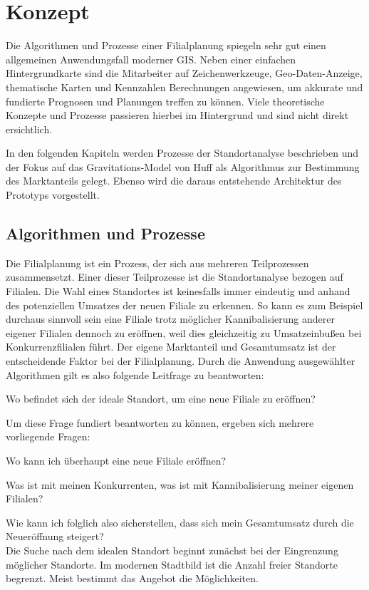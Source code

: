 \chapter{Konzept}
Die Algorithmen und Prozesse einer Filialplanung spiegeln sehr gut einen allgemeinen Anwendungsfall moderner GIS. 
Neben einer einfachen Hintergrundkarte sind die Mitarbeiter auf Zeichenwerkzeuge, Geo-Daten-Anzeige, thematische Karten und Kennzahlen Berechnungen angewiesen, um akkurate und fundierte Prognosen und Planungen treffen zu können.
Viele theoretische Konzepte und Prozesse passieren hierbei im Hintergrund und sind nicht direkt ersichtlich.


In den folgenden Kapiteln werden Prozesse der Standortanalyse beschrieben und der Fokus auf das Gravitations-Model von Huff als Algorithmus zur Bestimmung des Marktanteils gelegt.
Ebenso wird die daraus entstehende Architektur des Prototyps vorgestellt.
\section{Algorithmen und Prozesse}
Die Filialplanung ist ein Prozess, der sich aus mehreren Teilprozessen zusammensetzt. 
Einer dieser Teilprozesse ist die Standortanalyse bezogen auf Filialen.
Die Wahl eines Standortes ist keinesfalls immer eindeutig und anhand des potenziellen Umsatzes der neuen Filiale zu erkennen.
So kann es zum Beispiel durchaus sinnvoll sein eine Filiale trotz möglicher Kannibalisierung anderer eigener Filialen dennoch zu eröffnen, weil dies gleichzeitig zu Umsatzeinbußen bei Konkurrenzfilialen führt. 
Der eigene Marktanteil und Gesamtumsatz ist der entscheidende Faktor bei der Filialplanung.
Durch die Anwendung ausgewählter Algorithmen gilt es also folgende Leitfrage zu beantworten:

Wo befindet sich der ideale Standort, um eine neue Filiale zu eröffnen?

Um diese Frage fundiert beantworten zu können, ergeben sich mehrere vorliegende Fragen:

Wo kann ich überhaupt eine neue Filiale eröffnen?

Was ist mit meinen Konkurrenten, was ist mit Kannibalisierung meiner eigenen Filialen?

Wie kann ich folglich also sicherstellen, dass sich mein Gesamtumsatz durch die Neueröffnung steigert?\\

Die Suche nach dem idealen Standort beginnt zunächst bei der Eingrenzung möglicher Standorte.
Im modernen Stadtbild ist die Anzahl freier Standorte begrenzt.
Meist bestimmt das Angebot die Möglichkeiten.

